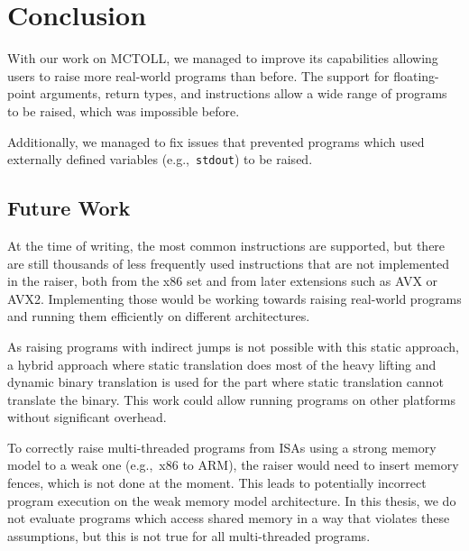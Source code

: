 
\chapter{Conclusion}\label{ch:conclusion}

With our work on MCTOLL, we managed to improve its capabilities allowing users to raise more real-world programs than before.
The support for floating-point arguments, return types, and instructions allow a wide range of programs to be raised, which was impossible before.

Additionally, we managed to fix issues that prevented programs which used externally defined variables (e.g.,\ \texttt{stdout}) to be raised.

\section{Future Work}\label{sec:future-work}

At the time of writing, the most common instructions are supported, but there are still thousands of less frequently used instructions that are not implemented in the raiser, both from the x86 set and from later extensions such as AVX or AVX2.
Implementing those would be working towards raising real-world programs and running them efficiently on different architectures.

As raising programs with indirect jumps is not possible with this static approach, a hybrid approach where static translation does most of the heavy lifting and dynamic binary translation is used for the part where static translation cannot translate the binary.
This work could allow running programs on other platforms without significant overhead.

To correctly raise multi-threaded programs from ISAs using a strong memory model to a weak one (e.g.,\ x86 to ARM), the raiser would need to insert memory fences, which is not done at the moment.
This leads to potentially incorrect program execution on the weak memory model architecture.
In this thesis, we do not evaluate programs which access shared memory in a way that violates these assumptions, but this is not true for all multi-threaded programs.
